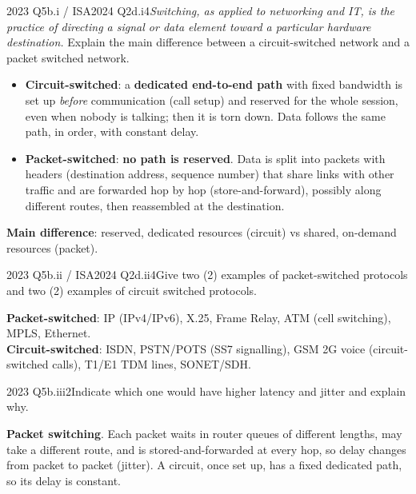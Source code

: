 \documentclass[10pt]{article}
\begin{document}
\begin{pastq}{2023 Q5b.i \textnormal{/} ISA2024 Q2d.i}{4}\emph{Switching, as applied to networking and IT, is the practice of directing a signal or data element toward a particular hardware destination.}
Explain the main difference between a circuit-switched network and a packet switched network.\end{pastq}
\begin{ans}
\begin{itemize}
\item \textbf{Circuit-switched}: a \textbf{dedicated end-to-end path} with fixed bandwidth is set up \emph{before} communication (call setup) and reserved for the whole session, even when nobody is talking; then it is torn down. Data follows the same path, in order, with constant delay.
\item \textbf{Packet-switched}: \textbf{no path is reserved}. Data is split into packets with headers (destination address, sequence number) that share links with other traffic and are forwarded hop by hop (store-and-forward), possibly along different routes, then reassembled at the destination.
\end{itemize}
\textbf{Main difference}: reserved, dedicated resources (circuit) vs shared, on-demand resources (packet).
\end{ans}

\begin{pastq}{2023 Q5b.ii \textnormal{/} ISA2024 Q2d.ii}{4}Give two (2) examples of packet-switched protocols and two (2) examples of circuit switched protocols.\end{pastq}
\begin{ans}
\textbf{Packet-switched}: IP (IPv4/IPv6), X.25, Frame Relay, ATM (cell switching), MPLS, Ethernet.\\
\textbf{Circuit-switched}: ISDN, PSTN/POTS (SS7 signalling), GSM 2G voice (circuit-switched calls), T1/E1 TDM lines, SONET/SDH.
\end{ans}

\begin{pastq}{2023 Q5b.iii}{2}Indicate which one would have higher latency and jitter and explain why.\end{pastq}
\begin{ans}
\textbf{Packet switching}. Each packet waits in router queues of different lengths, may take a different route, and is stored-and-forwarded at every hop, so delay changes from packet to packet (jitter). A circuit, once set up, has a fixed dedicated path, so its delay is constant.
\end{ans}
\end{document}
